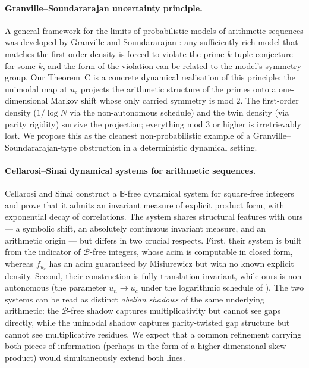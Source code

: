 \paragraph{Granville--Soundararajan uncertainty principle.}
A general framework for the limits of probabilistic models of arithmetic
sequences was developed by Granville and Soundararajan
\cite{granville2007uncertainty}: any sufficiently rich model that
matches the first-order density is forced to violate the prime $k$-tuple
conjecture for some $k$, and the form of the violation can be related
to the model's symmetry group. Our Theorem~C is a concrete dynamical
realisation of this principle: the unimodal map at $u_c$ projects the
arithmetic structure of the primes onto a one-dimensional Markov
shift whose only carried symmetry is mod $2$. The first-order density
($1/\log N$ via the non-autonomous schedule) and the twin density
(via parity rigidity) survive the projection; everything mod $3$ or
higher is irretrievably lost. We propose this as the cleanest
non-probabilistic example of a Granville--Soundararajan-type
obstruction in a deterministic dynamical setting.

\paragraph{Cellarosi--Sinai dynamical systems for arithmetic sequences.}
Cellarosi and Sinai \cite{cellarosi2013ergodic} construct a
$\mathbb{B}$-free dynamical system for square-free integers and prove
that it admits an invariant measure of explicit product form, with
exponential decay of correlations. The system shares structural
features with ours --- a symbolic shift, an absolutely continuous
invariant measure, and an arithmetic origin --- but differs in two
crucial respects. First, their system is built from the indicator of
$\mathcal{B}$-free integers, whose acim is computable in closed form,
whereas $f_{u_c}$ has an acim guaranteed by Misiurewicz
\cite{misiurewicz1981absolutely} but with no known explicit density.
Second, their construction is fully translation-invariant, while ours
is non-autonomous (the parameter $u_n \to u_c$ under the logarithmic
schedule of \cite{wang2026emergence}). The two systems can be read as
distinct \emph{abelian shadows} of the same underlying arithmetic: the
$\mathcal{B}$-free shadow captures multiplicativity but cannot see
gaps directly, while the unimodal shadow captures parity-twisted gap
structure but cannot see multiplicative residues. We expect that a
common refinement carrying both pieces of information (perhaps in the
form of a higher-dimensional skew-product) would simultaneously
extend both lines.

